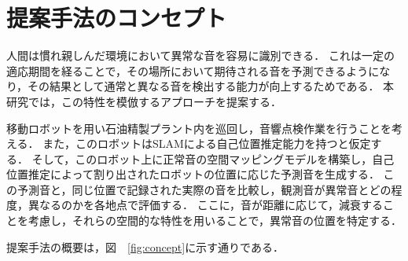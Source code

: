 \documentclass[../main]{subfiles}
\begin{document}
\section{提案手法のコンセプト}
人間は慣れ親しんだ環境において異常な音を容易に識別できる．
これは一定の適応期間を経ることで，その場所において期待される音を予測できるようになり，その結果として通常と異なる音を検出する能力が向上するためである．
本研究では，この特性を模倣するアプローチを提案する．

移動ロボットを用い石油精製プラント内を巡回し，音響点検作業を行うことを考える．
また，このロボットはSLAMによる自己位置推定能力を持つと仮定する．
そして，このロボット上に正常音の空間マッピングモデルを構築し，自己位置推定によって割り出されたロボットの位置に応じた予測音を生成する．
この予測音と，同じ位置で記録された実際の音を比較し，観測音が異常音とどの程度，異なるのかを各地点で評価する．
ここに，音が距離に応じて，減衰することを考慮し，それらの空間的な特性を用いることで，異常音の位置を特定する．

提案手法の概要は，図　\ref{fig:concept}に示す通りである．

\label{sec:pmethod_concept}
\end{document}
